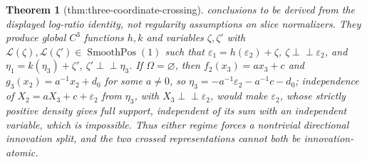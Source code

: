 \documentclass{article}
\newtheorem{theorem}{Theorem}
\begin{document}
\begin{theorem}[thm:three-coordinate-crossing]
conclusions to be derived from the displayed log-ratio identity, not regularity assumptions on slice normalizers. They produce global \(C^3\) functions \(h,k\) and variables \(\zeta,\zeta'\) with \(\mathcal L(\zeta),\mathcal L(\zeta')\in\operatorname{SmoothPos}(1)\) such that \(\varepsilon_1=h(\varepsilon_2)+\zeta\), \(\zeta\perp\!\!\!\perp\varepsilon_2\), and \(\eta_1=k(\eta_3)+\zeta'\), \(\zeta'\perp\!\!\!\perp\eta_3\). If \(\Omega=\varnothing\), then \(f_2(x_3)=ax_3+c\) and \(g_3(x_2)=a^{-1}x_2+d_0\) for some \(a\neq0\), so \(\eta_3=-a^{-1}\varepsilon_2-a^{-1}c-d_0\); independence of \(X_2=aX_3+c+\varepsilon_2\) from \(\eta_3\), with \(X_3\perp\!\!\!\perp\varepsilon_2\), would make \(\varepsilon_2\), whose strictly positive density gives full support, independent of its sum with an independent variable, which is impossible. Thus either regime forces a nontrivial directional innovation split, and the two crossed representations cannot both be innovation-atomic.
\end{theorem}
\end{document}
